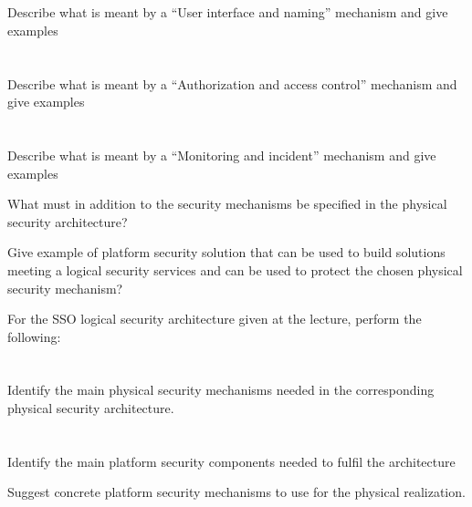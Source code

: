 \begin{questions}
\begin{parts}
  \part{} Describe what is meant by a ``User interface and naming'' mechanism and give examples
  \part{} Describe what is meant by a ``Authorization and access control'' mechanism and give examples
  \part{} Describe what is meant by a ``Monitoring and incident'' mechanism and give examples
  \end{parts}

\item What must in addition to the security mechanisms be specified in the physical security architecture?
\item Give example of platform security solution that can be used to build solutions meeting a logical security services and can be used to protect the chosen physical security mechanism?
\item For the SSO logical security architecture given at the lecture, perform the following:
  \begin{parts}
  \part{} Identify the main physical security mechanisms needed in the corresponding physical security architecture.
  \part{} Identify the main platform security components needed to fulfil the architecture
    \begin{subparts}
    \subpart{} Suggest concrete platform security mechanisms to use for the physical realization.
    \end{subparts}
  \end{parts}
\end{questions}

